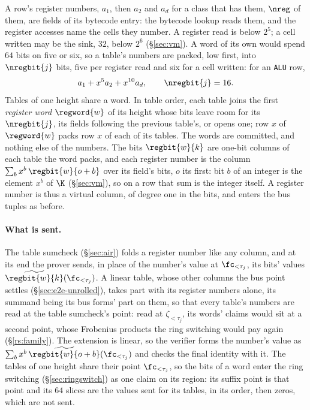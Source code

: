 A row's register numbers, $a_1$, then $a_2$ and $a_d$ for a class that has them, $\nreg$ of them, are fields of its bytecode entry: the bytecode lookup reads them, and the register accesses name the cells they number. A register read is below $2^{5}$; a cell written may be the sink, $32$, below $2^{6}$ (\S\ref{sec:vm}). A word of its own would spend $64$ bits on five or six, so a table's numbers are packed, low first, into $\nregbit{j}$ bits, five per register read and six for a cell written: for an \texttt{ALU} row,
\[
  a_1+x^{5}a_2+x^{10}a_d,\qquad \nregbit{j}=16.
\]
Tables of one height share a word. In table order, each table joins the first \emph{register word} $\regword{w}$ of its height whose bits leave room for its $\nregbit{j}$, its fields following the previous table's, or opens one; row $x$ of $\regword{w}$ packs row $x$ of each of its tables. The words are committed, and nothing else of the numbers. The bits $\regbit{w}{k}$ are one-bit columns of each table the word packs, and each register number is the column $\sum_{b}x^{b}\,\regbit{w}{o+b}$ over its field's bits, $o$ its first: bit $b$ of an integer is the element $x^{b}$ of $\K$ (\S\ref{sec:vm}), so on a row that sum is the integer itself. A register number is thus a virtual column, of degree one in the bits, and enters the bus tuples as before.

\paragraph{What is sent.} The table sumcheck (\S\ref{sec:air}) folds a register number like any column, and at its end the prover sends, in place of the number's value at $\fc_{<\tau_j}$, its bits' values $\widetilde{\regbit{w}{k}}(\fc_{<\tau_j})$. A linear table, whose other columns the bus point settles (\S\ref{sec:e2e-unrolled}), takes part with its register numbers alone, its summand being its bus forms' part on them, so that every table's numbers are read at the table sumcheck's point: read at $\zeta_{<\tau_j}$, its words' claims would sit at a second point, whose Frobenius products the ring switching would pay again (\S\ref{rs:family}). The extension is linear, so the verifier forms the number's value as $\sum_bx^{b}\,\widetilde{\regbit{w}{o+b}}(\fc_{<\tau_j})$ and checks the final identity with it. The tables of one height share their point $\fc_{<\tau_j}$, so the bits of a word enter the ring switching (\S\ref{sec:ringswitch}) as one claim on its region: its suffix point is that point and its $64$ slices are the values sent for its tables, in its order, then zeros, which are not sent.

